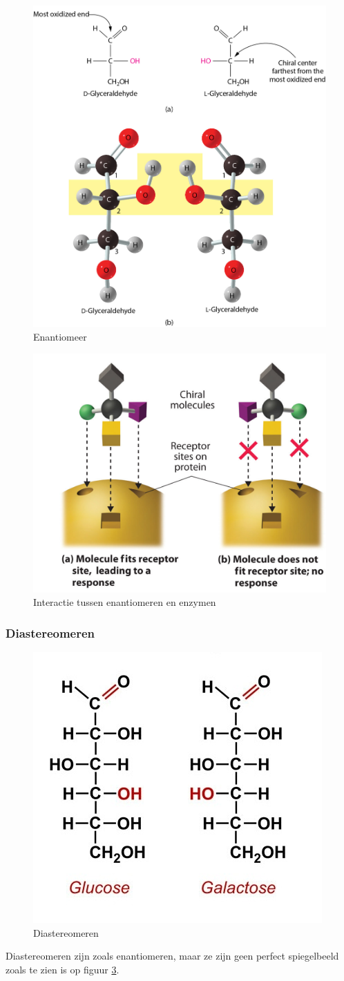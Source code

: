 \documentclass[a4paper,kul]{kulakarticle} %
\begin{document}
\begin{figure}[htbp]
	\centering
	\includegraphics[width=0.6\linewidth]{enantiomeren}
	\caption[Enantiomeer]{Enantiomeer}
	\label{fig:enantiomeren}
\end{figure}
\begin{figure}[htbp]
	\centering
	\includegraphics[width=0.5\linewidth]{EnantiomeerEnzym}
	\caption[Enantiomeer en enzym]{Interactie tussen enantiomeren en enzymen}
	\label{fig:enantiomeerenzym}
\end{figure}


\subsubsection{Diastereomeren}
\begin{figure}[htbp]
	\centering
	\includegraphics[width=0.4\linewidth]{Diastereomeren}
	\caption[Diastereomeren]{Diastereomeren}
	\label{fig:diastereomeren}
\end{figure}
Diastereomeren zijn zoals enantiomeren, maar ze zijn geen perfect spiegelbeeld zoals te zien is op figuur \ref{fig:diastereomeren}.
\end{document}
